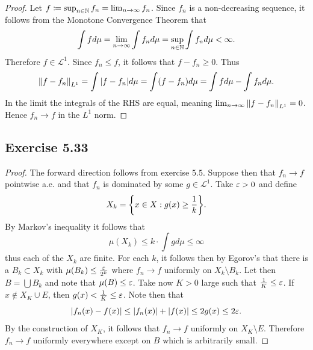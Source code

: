 \documentclass[hw_all.tex]{subfiles}
\begin{document}
\begin{proof}
    Let $f \coloneq \sup_{n \in \mathbb{N}} f_n = \lim_{n \to \infty} f_n$. Since $f_n$ is a non-decreasing sequence, it follows from the Monotone Convergence Theorem that
    \[
        \int f d\mu = \lim_{n \to \infty} \int f_n d \mu = \sup_{n \in \mathbb{N}} \int f_n d \mu < \infty
    .\]
    Therefore $f \in \mathcal{L}^1$. Since $f_n \leq f$, it follows that $f - f_n \geq 0$. Thus
    \[
        \norm{f - f_n}_{L^1} = \int | f - f_n | d \mu = \int (f - f_n) d \mu = \int f d \mu - \int f_n d \mu
    .\]
    In the limit the integrals of the RHS are equal, meaning $\lim_{n \to \infty} \norm{f - f_n}_{L^1} = 0$. Hence $f_n \to f$ in the $L^1$ norm.
\end{proof}

\subsection{Exercise 5.33}

\begin{proof}
    The forward direction follows from exercise $5.5$. Suppose then that $f_n \to f$ pointwise a.e. and that $f_n$ is dominated by some $g \in \mathcal{L}^1$. Take $\varepsilon > 0$ and define
    \[
        X_k = \qty{x \in X : g(x) \geq \frac{1}{k}}
    .\]
    By Markov's inequality it follows that
    \[
        \mu(X_k) \leq k \cdot \int g d \mu \leq \infty
    \]
    thus each of the $X_k$ are finite. For each $k$, it follows then by Egorov's that there is a $B_k \subset X_k$ with $\mu(B_k) \leq \frac{\varepsilon}{2^k}$ where $f_n \to f$ uniformly on $X_k \setminus B_k$. Let then $B = \bigcup B_k$ and note that $\mu(B) \leq \varepsilon$. Take now $K > 0$ large such that $\frac{1}{K} \leq \varepsilon$. If $x \notin X_K \cup E$, then $g(x) < \frac{1}{K} \leq \varepsilon$. Note then that
    \[
        |f_n(x) - f(x)| \leq |f_n(x)| + |f(x)| \leq 2 g(x) \leq 2 \varepsilon
    .\]
    By the construction of $X_K$, it follows that $f_n \to f$ uniformly on $X_K \setminus E$. Therefore $f_n \to f$ uniformly everywhere except on $B$ which is arbitrarily small.
\end{proof}
\end{document}
